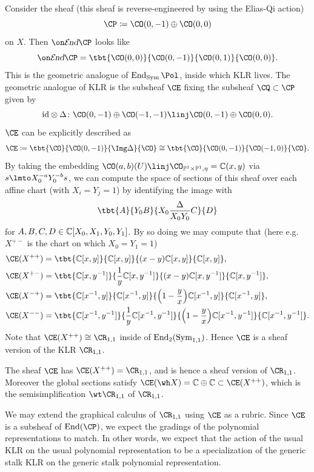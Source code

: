 \documentclass[11pt,reqno]{amsart}
\begin{document}
Consider the sheaf (this sheaf is reverse-engineered by using the Elias-Qi action)
\[\CP\coloneqq \CO(0,-1)\oplus \CO(0,0)\] 
on $ X$. Then $\shend\CP$ looks like
\[\shend\CP=\tbt{\CO(0,0)}{\CO(0,-1)}{\CO(0,1)}{\CO(0,0)}.\] 
This is the geometric analogue of $\End_{\Sym}\Pol$, inside which KLR lives. The geometric analogue of KLR is the subsheaf $\CE$ fixing the subsheaf $\CQ\subset\CP$ given by
\[\id\otimes \Delta\colon \CO(0,-1)\oplus \CO(-1,-1)\linj \CO(0,-1)\oplus \CO(0,0).\] 
$\CE$ can be explicitly described as
\[\CE\coloneqq \tbt{\CO}{\CO(0,-1)}{\Img\Delta}{\CO}\cong \tbt{\CO}{\CO(0,-1)}{\CO(-1,0)}{\CO}.\] 
By taking the embedding $\CO(a,b)(U)\linj \CO_{\BP^1\times\BP^1,\eta}=\BC(x,y)$ via $s\lmto X_0^{-a}Y_0^{-b}s$, we can compute the space of sections of this sheaf over each affine chart (with $X_i=Y_j=1$) by identifying the image with
\[\tbt{A}{Y_0B}{X_0\frac{\Delta}{X_0Y_0}C}{D}\] 
for $A,B,C,D\in\mathbb C[X_0,X_1,Y_0,Y_1]$.
By so doing we may compute that (here e.g. $X^{+-}$ is the chart on which $X_0=Y_1=1$)
\begin{align*}
    \CE(X^{++})%
    &=\tbt{\BC[x,y]}{\BC[x,y]}{(x-y)\BC[x,y]}{\BC[x,y]},\\
    \CE(X^{+-})&=\tbt{\BC[x,y^{-1}]}{\frac{1}{y}\BC[x,y^{-1}]}{(x-y)\BC[x,y^{-1}]}{\BC[x,y^{-1}]},\\
    \CE(X^{-+})&=\tbt{\BC[x^{-1},y]}{\BC[x^{-1},y]}{\pr*{1-\frac{y}{x}}\BC[x^{-1},y]}{\BC[x^{-1},y]},\\
    \CE(X^{--})&=\tbt{\BC[x^{-1},y^{-1}]}{\frac{1}{y}\BC[x^{-1},y^{-1}]}{\pr*{1-\frac{y}{x}}\BC[x^{-1},y^{-1}]}{\BC[x^{-1},y^{-1}]}.
\end{align*}
Note that $\CE(X^{++})\cong\CR_{1,1}$ inside of $\operatorname{End}_{2}(\operatorname{Sym}_{1,1})$. Hence $\CE$ is a sheaf version of the KLR $\CR_{1,1}$. 
\begin{proposition}
    The sheaf $\CE$ has $\CE(X^{++})=\CR_{1,1}$, and is hence a sheaf version of $\CR_{1,1}$. Moreover the global sections satisfy $\CE(\wh X)=\BC\oplus\BC\subset \CE(X^{++})$, which is the semisimplification $\wt\CR_{1,1}$ of $\CR_{1,1}$. 
\end{proposition}

We may extend the graphical calculus of $\CR_{1,1}$ using $\CE$ as a rubric. Since $\CE$ is a subsheaf of $\End(\CP)$, we expect the gradings of the polynomial representations to match. In other words, we expect that the action of the usual KLR on the usual polynomial representation to be a specialization of the generic stalk KLR on the generic stalk polynomial representation. 
\end{document}
